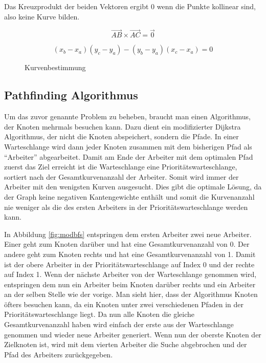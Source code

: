 \documentclass[a4paper,10pt,ngerman]{scrartcl}
\begin{document}
Das Kreuzprodukt der beiden Vektoren ergibt 0 wenn die Punkte kollinear sind, also keine Kurve bilden.

$$
\overrightarrow{AB} \times \overrightarrow{AC} = \vec{0}
$$

$$
(x_b - x_a)(y_c - y_a) - (y_b - y_a)(x_c - x_a) = 0
$$

\begin{figure}[ht]
  \centering
  \caption{Kurvenbestimmung}
\end{figure}

\subsection{Pathfinding Algorithmus}
Um das zuvor genannte Problem zu beheben, braucht man einen Algorithmus, der Knoten mehrmals besuchen kann. Dazu dient ein modifizierter Dijkstra Algorithmus,
der nicht die Knoten abspeichert, sondern die Pfade. In einer Warteschlange wird dann jeder Knoten zusammen mit dem bisherigen Pfad als
``Arbeiter'' abgearbeitet. Damit am Ende der Arbeiter mit dem optimalen Pfad zuerst das Ziel erreicht ist die Warteschlange eine Prioritätswarteschlange,
sortiert nach der Gesamtkurvenanzahl der Arbeiter. Somit wird immer der Arbeiter mit den wenigsten Kurven ausgesucht. Dies gibt die optimale Lösung, da
der Graph keine negativen Kantengewichte enthält und somit die Kurvenanzahl nie weniger als die des ersten Arbeiters in der Prioritätswarteschlange werden kann.

In Abbildung \ref{fig:modbfs} entspringen dem ersten Arbeiter zwei neue Arbeiter. Einer geht zum Knoten darüber und hat eine Gesamtkurvenanzahl von 0. Der andere
geht zum Knoten rechts und hat eine Gesamtkurvenanzahl von 1. Damit ist der obere Arbeiter in der Prioritätswarteschlange auf Index 0 und der rechte auf Index 1.
Wenn der nächste Arbeiter von der Warteschlange genommen wird, entspringen dem nun ein Arbeiter beim Knoten darüber rechts und ein Arbeiter an der selben Stelle wie
der vorige. Man sieht hier, dass der Algorithmus Knoten öfters besuchen kann, da ein Knoten unter zwei verschiedenen Pfaden in der Prioritätswarteschlange liegt.
Da nun alle Knoten die gleiche Gesamtkurvenanzahl haben wird einfach der erste aus der Warteschlange genommen und wieder neue Arbeiter generiert. Wenn nun der oberste
Knoten der Zielknoten ist, wird mit dem vierten Arbeiter die Suche abgebrochen und der Pfad des Arbeiters zurückgegeben.
\end{document}
